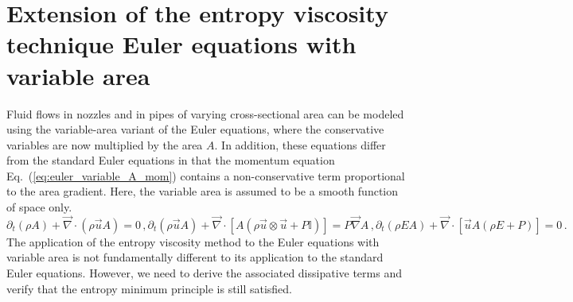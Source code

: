 \documentclass[preprint,10pt]{elsarticle}
\renewcommand{\div}{\vec{\nabla}\! \cdot \!}
\newcommand{\grad}{\vec{\nabla}}
\newcommand{\eqt}[1]{Eq.~(\ref{#1})}                     %
\begin{document}
\section{Extension of the entropy viscosity technique Euler equations with variable area} \label{sec:var_area_diss_terms}

Fluid flows in nozzles and in pipes of varying cross-sectional area can be modeled using the variable-area 
variant of the Euler equations, where the conservative variables are now multiplied by the area $A$. 
In addition, these equations differ from the standard Euler equations in that the momentum equation 
\eqt{eq:euler_variable_A_mom} contains a non-conservative term proportional to the area gradient. 
Here, the variable area is assumed to be a smooth function of space only. 
\begin{subequations}
\label{eq:euler_variable_A}
\begin{equation}
\label{eq:euler_variable_A_continuity}
\partial_t \left( \rho A \right) + \div \left( \rho \vec{u} A \right) = 0 \,,
\end{equation}
%
\begin{equation}
\label{eq:euler_variable_A_mom}
\partial_t \left( \rho \vec{u} A \right) + \div \left[A\left( \rho \vec{u} \otimes \vec{u} + P \mathbb{I} \right) \right] = P \grad A \,,
\end{equation}
% 
\begin{equation}
\label{eq:euler_variable_A_energy}
\partial_t \left( \rho E A \right) + \div \left[ \vec{u} A \left( \rho E + P \right) \right] = 0 \,.
\end{equation}
\end{subequations}
%
The application of the entropy viscosity method to the Euler equations with variable area is not 
fundamentally different to its application to the standard Euler equations. However, we need to 
derive the associated dissipative terms and verify that the entropy minimum principle is still satisfied.  
\end{document}
